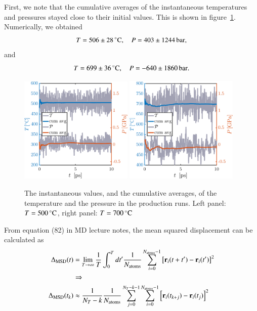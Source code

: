 First, we note that the cumulative averages of the instantaneous temperatures and pressures stayed close to their initial values. This is shown in figure~\ref{fig:prod}. Numerically, we obtained 
\begin{equation}
T=\unit[506\pm 28]{^\circ C},\quad  P = \unit[403 \pm 1244]{bar},
\end{equation} 
and 
\begin{equation}
T=\unit[699\pm 36]{^\circ C},\quad P = \unit[-640 \pm 1860]{bar}.
\end{equation} 
\begin{figure}[!ht]
\begin{center}
  \includegraphics[width=0.48\textwidth]{../figures/TP-prod-500} 
    \includegraphics[width=0.48\textwidth]{../figures/TP-prod-700} 
  \caption{The instantaneous values, and the cumulative averages, of the temperature and the pressure in the production runs. Left panel: $T=\unit[500]{^\circ C}$,  right panel: $T=\unit[700]{^\circ C}$}
  \label{fig:prod}
\end{center}
\end{figure}

From equation (82) in MD lecture notes, the mean squared displacement can be calculated as
\begin{align}
\Delta_{\rm MSD}(t) &= \lim_{T \rightarrow \infty} \frac{1}{T} \int_0^{T} d t' \frac{1}{N_{\rm atoms}} \sum_{i=0}^{N_{\rm atoms}-1} \left[{\bf r}_i(t+t') - {\bf r}_i(t') \right]^2 \\ &\Rightarrow \nonumber
\\
\Delta_{\rm MSD}(t_k) &\approx
\frac{1}{N_T -k}\frac{1}{N_{\rm atoms}} \sum_{j=0}^{N_T-k-1} \sum_{i=0}^{N_{\rm atoms}-1} \left[{\bf r}_i(t_{k+j}) - {\bf r}_i(t_j) \right]^2 
\label{eq:1}
\end{align}


